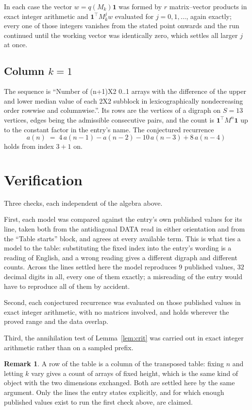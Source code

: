 \documentclass[11pt,a4paper]{article}
\theoremstyle{plain}
\theoremstyle{definition}
\newtheorem{remark}[theorem]{Remark}
\begin{document}
In each case the vector $w=q(M_k)\mathbf{1}$ was formed by $r$ matrix--vector products in
exact integer arithmetic and $\mathbf{1}^{\!\top}M_k^{j}w$ evaluated for $j=0,1,\dots$,
again exactly; every one of those integers vanishes from the stated point onwards and the run
continued until the working vector was identically zero, which settles all larger $j$ at once.

\subsection*{Column $k$$=1$}
The sequence is ``Number of (n+1)X2 0..1 arrays with the difference of the upper and lower median value of each 2X2 subblock in lexicographically nondecreasing order rowwise and columnwise.''. Its rows are the vertices of a digraph on
$S=13$ vertices, edges being the admissible consecutive pairs, and the count is
$\mathbf{1}^{\!\top}M^{n}\mathbf{1}$ up to the constant factor in the entry's name.
The conjectured recurrence
\[
a(n)\;=\;4\,a(n-1) - a(n-2) - 10\,a(n-3) + 8\,a(n-4)
\]
holds from index $3+1$ on.

\section{Verification}

Three checks, each independent of the algebra above.

First, each model was compared against the entry's own published values for its line, taken
both from the antidiagonal DATA read in either orientation and from the ``Table starts''
block, and agrees at every available term. This is what ties a model to the table:
substituting the fixed index into the entry's wording is a reading of English, and a wrong
reading gives a different digraph and different counts. Across the lines settled here the
model reproduces $9$ published values, $32$ decimal digits in all, every one of
them exactly; a misreading of the entry would have to reproduce all of them by accident.

Second, each conjectured recurrence was evaluated on those published values in exact
integer arithmetic, with no matrices involved, and holds wherever the proved range and the
data overlap.

Third, the annihilation test of Lemma~\ref{lem:crit} was carried out in exact integer
arithmetic rather than on a sampled prefix.

\begin{remark}
A row of the table is a column of the transposed table: fixing $n$ and letting $k$ vary gives a
count of arrays of fixed height, which is the same kind of object with the two dimensions
exchanged. Both are settled here by the same argument. Only the lines the entry states
explicitly, and for which enough published values exist to run the first check above, are
claimed.
\end{remark}
\end{document}
